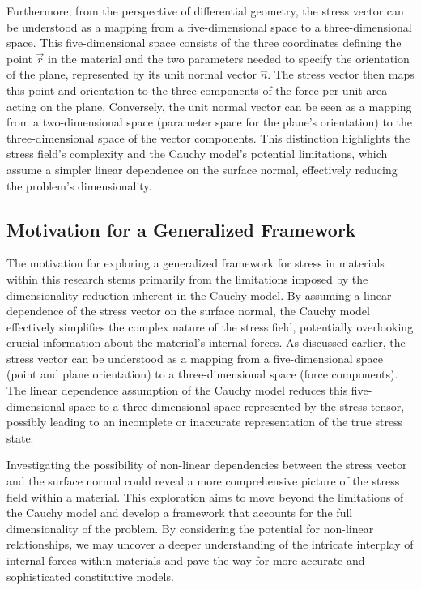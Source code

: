 \documentclass[12pt,a4paper,english]{article}
\begin{document}
Furthermore, from the perspective of differential geometry, the stress vector can be understood as a mapping from a five-dimensional space to a three-dimensional space. This five-dimensional space consists of the three coordinates defining the point $\vec{r}$ in the material and the two parameters needed to specify the orientation of the plane, represented by its unit normal vector $\hat{n}$. The stress vector then maps this point and orientation to the three components of the force per unit area acting on the plane. Conversely, the unit normal vector can be seen as a mapping from a two-dimensional space (parameter space for the plane's orientation) to the three-dimensional space of the vector components. This distinction highlights the stress field's complexity and the Cauchy model's potential limitations, which assume a simpler linear dependence on the surface normal, effectively reducing the problem's dimensionality.

\subsection{Motivation for a Generalized Framework} %


The motivation for exploring a generalized framework for stress in materials within this research stems primarily from the limitations imposed by the dimensionality reduction inherent in the Cauchy model. By assuming a linear dependence of the stress vector on the surface normal, the Cauchy model effectively simplifies the complex nature of the stress field, potentially overlooking crucial information about the material's internal forces. As discussed earlier, the stress vector can be understood as a mapping from a five-dimensional space (point and plane orientation) to a three-dimensional space (force components). The linear dependence assumption of the Cauchy model reduces this five-dimensional space to a three-dimensional space represented by the stress tensor, possibly leading to an incomplete or inaccurate representation of the true stress state.

Investigating the possibility of non-linear dependencies between the stress vector and the surface normal could reveal a more comprehensive picture of the stress field within a material. This exploration aims to move beyond the limitations of the Cauchy model and develop a framework that accounts for the full dimensionality of the problem. By considering the potential for non-linear relationships, we may uncover a deeper understanding of the intricate interplay of internal forces within materials and pave the way for more accurate and sophisticated constitutive models.
\end{document}
